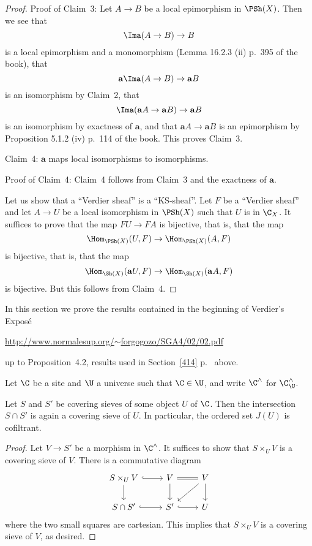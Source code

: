 \documentclass[12pt]{article}
\theoremstyle{remark}
\theoremstyle{definition}
\begin{document}
\begin{proof}
\nn Proof of Claim~3: Let $A\to B$ be a local epimorphism in $\PSh(X)$. Then we see that 
$$
\Ima(A\to B)\to B
$$ 
is a local epimorphism and a monomorphism (Lemma 16.2.3 (ii) p.~395 of the book), that 
$$
\mathbf a\Ima(A\to B)\to\mathbf aB
$$ 
is an isomorphism by Claim~2, that 
$$
\Ima(\mathbf aA\to\mathbf aB)\to\mathbf aB
$$ 
is an isomorphism by exactness of $\mathbf a$, and that $\mathbf aA\to\mathbf aB$ is an epimorphism by Proposition 5.1.2 (iv) p.~114 of the book. This proves Claim~3. 

\nn Claim~4: $\mathbf a$ maps local isomorphisms to isomorphisms.

\nn Proof of Claim~4: Claim~4 follows from Claim~3 and the exactness of $\mathbf a$.

Let us show that a ``Verdier sheaf'' is a ``KS-sheaf''. Let $F$ be a ``Verdier sheaf'' and let $A\to U$ be a local isomorphism in $\PSh(X)$ such that $U$ is in $\C_X$. It suffices to prove that the map $FU\to FA$ is bijective, that is, that the map 
$$
\Hom_{\PSh(X)}(U,F)\to\Hom_{\PSh(X)}(A,F)
$$ 
is bijective, that is, that the map
$$
\Hom_{\Sh(X)}(\mathbf aU,F)\to\Hom_{\Sh(X)}(\mathbf aA,F)
$$ 
is bijective. But this follows from Claim~4.
\end{proof}

%


In this section we prove the results contained in the beginning of Verdier's Exposé\medskip 

\centerline{\href{http://www.normalesup.org/~forgogozo/SGA4/02/02.pdf}{http://www.normalesup.org/$\sim$forgogozo/SGA4/02/02.pdf}}

\nn up to Proposition~4.2, results used in Section~\ref{414} p.~\pageref{414} above.

Let $\C$ be a site and $\U$ a universe such that $\C\in\U$, and write $\C^\wedge$ for $\C^\wedge_\U$.

\begin{lem}[1.1.1]
Let $S$ and $S'$ be covering sieves of some object $U$ of $\C$. Then the intersection $S\cap S'$ is again a covering sieve of $U$. In particular, the ordered set $J(U)$ is cofiltrant.
\end{lem}
%
\begin{proof}
Let $V\to S'$ be a morphism in $\C^\wedge$. It suffices to show that $S\times_UV$ is a covering sieve of $V$. There is a commutative diagram 
$$
\begin{tikzcd}
S\times_UV\ar[d]\ar[r,hookrightarrow]&V\ar[d]\ar[r,equal]&V\ar[d]\ar[dl]\\ 
S\cap S'\ar[r,hookrightarrow]&S'\ar[r,hookrightarrow]&U
\end{tikzcd}
$$ 
where the two small squares are cartesian. This implies that $S\times_UV$ is a covering sieve of $V$, as desired.
\end{proof}
\end{document}
